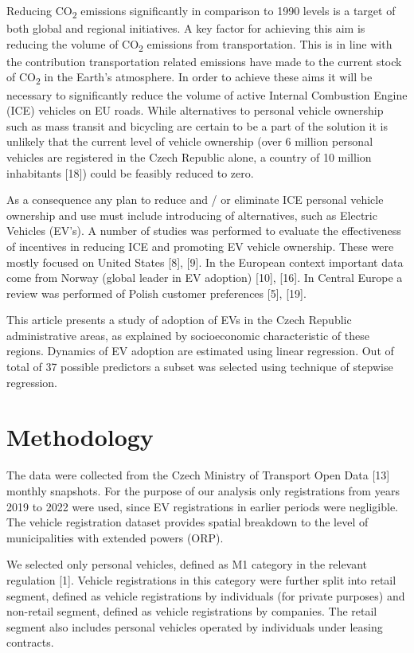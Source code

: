 \documentclass{mmeproc}
\begin{document}
Reducing CO\textsubscript{2} emissions significantly in comparison to
1990 levels is a target of both global and regional initiatives. 
A key factor for achieving this aim is reducing the volume of
CO\textsubscript{2} emissions from transportation. This is in line with
the contribution transportation related emissions have made to the
current stock of CO\textsubscript{2} in the Earth's atmosphere. In order
to achieve these aims it will be necessary to significantly reduce the
volume of active Internal Combustion Engine (ICE) vehicles on EU roads.
While alternatives to personal vehicle ownership such as mass transit
and bicycling are certain to be a part of the solution it is unlikely
that the current level of vehicle ownership (over 6 million personal
vehicles are registered in the Czech Republic alone, a country of 10
million inhabitants {[}18{]}) could be feasibly reduced to zero.

As a consequence any plan to reduce and / or eliminate ICE personal
vehicle ownership and use must include introducing of alternatives, such
as Electric Vehicles (EV's). A number of studies was performed to
evaluate the effectiveness of incentives in reducing ICE and promoting
EV vehicle ownership. These were mostly focused on United States
{[}8{]}, {[}9{]}. In the European context important data come from
Norway (global leader in EV adoption) {[}10{]}, {[}16{]}. In Central
Europe a review was performed of Polish customer preferences {[}5{]},
{[}19{]}.

This article presents a study of adoption of EVs in the Czech Republic
administrative areas, as explained by socioeconomic characteristic of
these regions. Dynamics of EV adoption are estimated using linear
regression. Out of total of 37 possible predictors a subset was selected
using technique of stepwise regression.

\hypertarget{methodology}{%
\section{Methodology}\label{methodology}}

The data were collected from the Czech Ministry of Transport Open Data
{[}13{]} monthly snapshots. For the purpose of our analysis only
registrations from years 2019 to 2022 were used, since EV registrations
in earlier periods were negligible. The vehicle registration dataset
provides spatial breakdown to the level of municipalities with extended
powers (ORP).

We selected only personal vehicles, defined as M1 category in the
relevant regulation {[}1{]}. Vehicle registrations in this category
were further split into retail segment, defined as vehicle registrations
by individuals (for private purposes) and non-retail segment, defined as
vehicle registrations by companies. The retail segment also includes
personal vehicles operated by individuals under leasing contracts.
\end{document}
